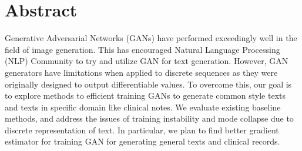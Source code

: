 \documentclass[12pt]{report}
\begin{document}
\tableofcontents 
\newpage
\section*{Abstract} 
Generative Adversarial Networks (GANs) have performed exceedingly well in the field of image generation. This has encouraged Natural Language Processing (NLP) Community to try and utilize GAN for text generation. However, GAN generators have limitations when applied to discrete sequences as they were originally designed to output differentiable values. To overcome this, our goal is to explore methods to efficient training GANs to generate common style texts and texts in specific domain like clinical notes. We evaluate existing baseline methods, and address the issues of training instability and mode collapse due to discrete representation of text. In particular, we plan to find better gradient estimator for training GAN for generating general texts and clinical records.
\end{document}

